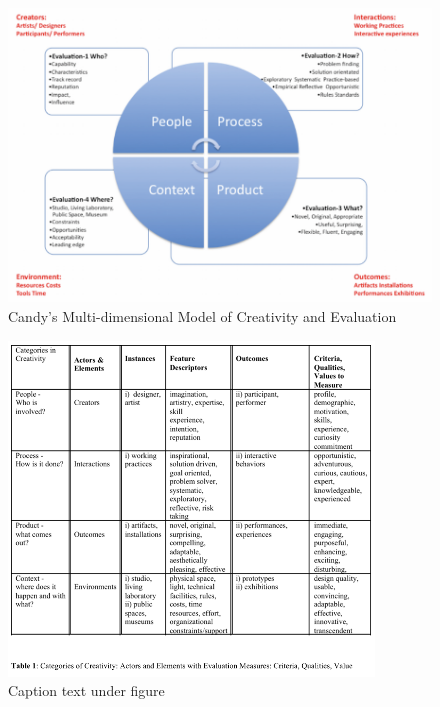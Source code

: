 \begin{figure}[htb] %
  \centering
  \includegraphics[width=\linewidth]{images/candy02.png}
\caption[Multi-dimensional Model of Creativity and Evaluation]{Candy's Multi-dimensional Model of Creativity and Evaluation}
\label{fig:candy02}
\end{figure}

\begin{figure}[htb] %
  \centering
  \includegraphics[width=\linewidth]{images/candy01.png}
\caption[Text for Table of Contents]{Caption text under figure}
\label{fig:candy01}
\end{figure}

